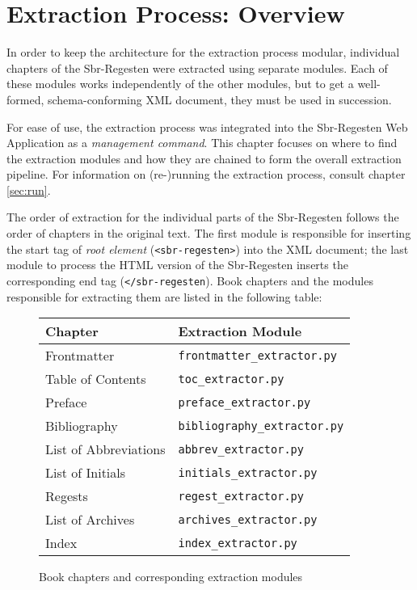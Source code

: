 \section{Extraction Process: Overview}

In order to keep the architecture for the extraction process modular,
individual chapters of the Sbr-Regesten were extracted using separate
modules. Each of these modules works independently of the other
modules, but to get a well-formed, schema-conforming XML document,
they must be used in succession.

For ease of use, the extraction process was integrated into the
Sbr-Regesten Web Application as a \emph{management command}. This
chapter focuses on where to find the extraction modules and how they
are chained to form the overall extraction pipeline. For information
on (re-)running the extraction process, consult chapter \ref{sec:run}.

The order of extraction for the individual parts of the Sbr-Regesten
follows the order of chapters in the original text. The first module
is responsible for inserting the start tag of \emph{root element}
(\texttt{<sbr-regesten>}) into the XML document; the last module to
process the HTML version of the Sbr-Regesten inserts the corresponding
end tag (\texttt{</sbr-regesten}). Book chapters and the modules
responsible for extracting them are listed in the following table:

\begin{figure}[h]
  \centering
  \begin{tabular}{l|l}
    \hline
    Chapter & Extraction Module \\
    \hline
    Frontmatter & \texttt{frontmatter\_extractor.py} \\
    Table of Contents & \texttt{toc\_extractor.py} \\
    Preface & \texttt{preface\_extractor.py} \\
    Bibliography & \texttt{bibliography\_extractor.py} \\
    List of Abbreviations & \texttt{abbrev\_extractor.py} \\
    List of Initials & \texttt{initials\_extractor.py} \\
    Regests & \texttt{regest\_extractor.py} \\
    List of Archives & \texttt{archives\_extractor.py} \\
    Index & \texttt{index\_extractor.py} \\
    \hline
  \end{tabular}
  \caption{Book chapters and corresponding extraction modules}
  \label{fig:extraction-modules}
\end{figure}


